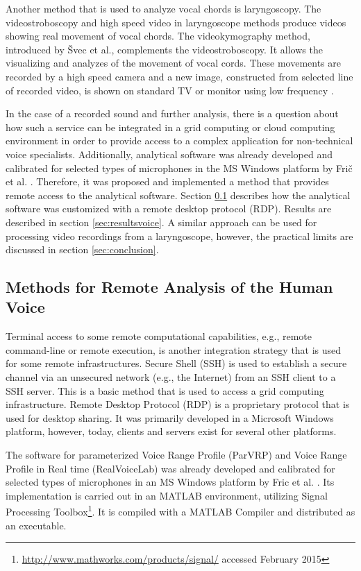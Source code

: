 Another method that is used to analyze vocal chords is laryngoscopy. The videostroboscopy and high speed video in laryngoscope methods produce videos showing real movement of vocal chords. The videokymography method, introduced by Švec et al., complements the videostroboscopy. It allows the visualizing and analyzes of the movement of vocal cords. These movements are recorded by a high speed camera and a new image, constructed from selected line of recorded video, is shown on standard TV or monitor using low frequency \cite{Svec1996,Svec2007}. 

In the case of a recorded sound and further analysis, there is a question about how such a service can be integrated in a grid computing or cloud computing environment in order to provide access to a complex application for non-technical voice specialists. Additionally, analytical software was already developed and calibrated for selected types of microphones in the MS Windows platform by Frič et al. \cite{Fric2007,Fric2012}. Therefore, it was proposed and implemented a method that provides remote access to the analytical software. Section \ref{sec:methodsvoice} describes how the analytical software was customized with a remote desktop protocol (RDP). Results are described in section \ref{sec:resultsvoice}. A similar approach can be used for processing  video recordings from a laryngoscope, however, the practical limits are discussed in section \ref{sec:conclusion}. 

\subsection{Methods for Remote Analysis of the Human Voice}
\label{sec:methodsvoice}
Terminal access to some remote computational capabilities, e.g., remote command-line or remote execution, is another integration strategy that is used for some remote infrastructures. Secure Shell (SSH) is used to establish a secure channel via an unsecured network (e.g., the Internet) from an SSH client to a SSH server. This is a basic method that is used to access a grid computing infrastructure. 
Remote Desktop Protocol (RDP) is a proprietary protocol that is used for desktop sharing. It was primarily developed in a Microsoft Windows platform, however, today, clients and servers exist for several other platforms. 

The software for parameterized Voice Range Profile (ParVRP) and Voice Range Profile in Real time (RealVoiceLab) was already developed and calibrated for selected types of microphones in an MS Windows platform by Fric et al. \cite{Fric2007,Fric2012}. Its implementation is carried out in an MATLAB environment, utilizing Signal Processing Toolbox\footnote{\url{http://www.mathworks.com/products/signal/} accessed February 2015}. It is compiled with a MATLAB Compiler and distributed as an executable.

